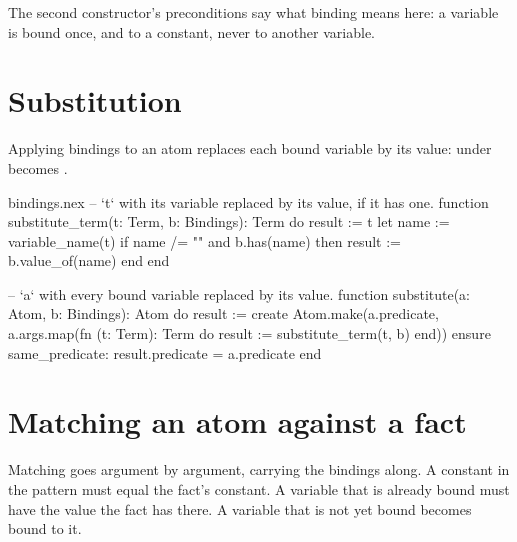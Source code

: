 The second constructor's preconditions say what binding means here: a
variable is bound once, and to a constant, never to another variable.

\section{Substitution}

Applying bindings to an atom replaces each bound variable by its value:
 under  becomes .

\begin{continued}{bindings.nex}
-- `t` with its variable replaced by its value, if it has one.
function substitute_term(t: Term, b: Bindings): Term
do
  result := t
  let name := variable_name(t)
  if name /= "" and b.has(name) then
    result := b.value_of(name)
  end
end

-- `a` with every bound variable replaced by its value.
function substitute(a: Atom, b: Bindings): Atom
do
  result := create Atom.make(a.predicate, a.args.map(fn (t: Term): Term do
    result := substitute_term(t, b)
  end))
ensure
  same_predicate: result.predicate = a.predicate
end
\end{continued}

\section{Matching an atom against a fact}

Matching goes argument by argument, carrying the bindings along. A constant
in the pattern must equal the fact's constant. A variable that is already
bound must have the value the fact has there. A variable that is not yet
bound becomes bound to it.

